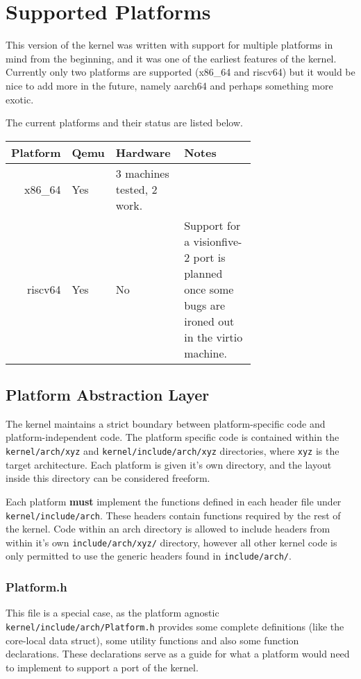 \section{Supported Platforms}
This version of the kernel was written with support for multiple platforms in mind from the beginning, and it was one of the earliest features of the kernel. Currently only two platforms are supported (x86\_64 and riscv64) but it would be nice to add more in the future, namely aarch64 and perhaps something more exotic.

The current platforms and their status are listed below.

\begin{tabular}{|r|l|p{0.3\linewidth}|p{0.4\linewidth}|}
    \hline
    \textbf{Platform} & \textbf{Qemu} & \textbf{Hardware} & \textbf{Notes} \\
    \hline
    x86\_64 & Yes & 3 machines tested, 2 work. & \\
    riscv64 & Yes & No & Support for a visionfive-2 port is planned once some bugs are ironed out in the virtio machine.\\
    \hline
\end{tabular}

\subsection{Platform Abstraction Layer}
The kernel maintains a strict boundary between platform-specific code and platform-independent code. The platform specific code is contained within the \verb|kernel/arch/xyz| and \verb|kernel/include/arch/xyz| directories, where \verb|xyz| is the target architecture. Each platform is given it's own directory, and the layout inside this directory can be considered freeform.

Each platform \textbf{must} implement the functions defined in each header file under \verb|kernel/include/arch|. These headers contain functions required by the rest of the kernel. Code within an arch directory is allowed to include headers from within it's own \verb|include/arch/xyz/| directory, however all other kernel code is only permitted to use the generic headers found in \verb|include/arch/|.

\subsubsection{Platform.h}
This file is a special case, as the platform agnostic \verb|kernel/include/arch/Platform.h| provides some complete definitions (like the core-local data struct), some utility functions and also some function declarations. These declarations serve as a guide for what a platform would need to implement to support a port of the kernel. 

